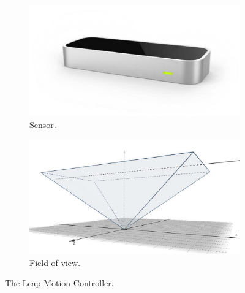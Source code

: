 \begin{figure}[hbt]
    \centering
    \begin{subfigure}{.44\linewidth}
        \centering
        \includegraphics[width=\linewidth]{Figures/RadarExperiments/Sensors/lmc.pdf}
        \captionsetup{width=.99\linewidth}
        \caption{Sensor.}
        \label{fig:radar-experiments:lmc:product}
    \end{subfigure}
    \begin{subfigure}{.55\linewidth}
        \centering
        \includegraphics[width=\linewidth,trim={0.2cm 0.2cm 0.2cm 1.5cm},clip]{Figures/RadarExperiments/Sensors/lmc-fov.pdf}
        \captionsetup{width=.99\linewidth}
        \caption{Field of view.}
        \label{fig:radar-experiments:lmc:fov}
    \end{subfigure}
    \caption{The Leap Motion Controller.}
    \label{fig:radar-experiments:lmc}
\end{figure}

